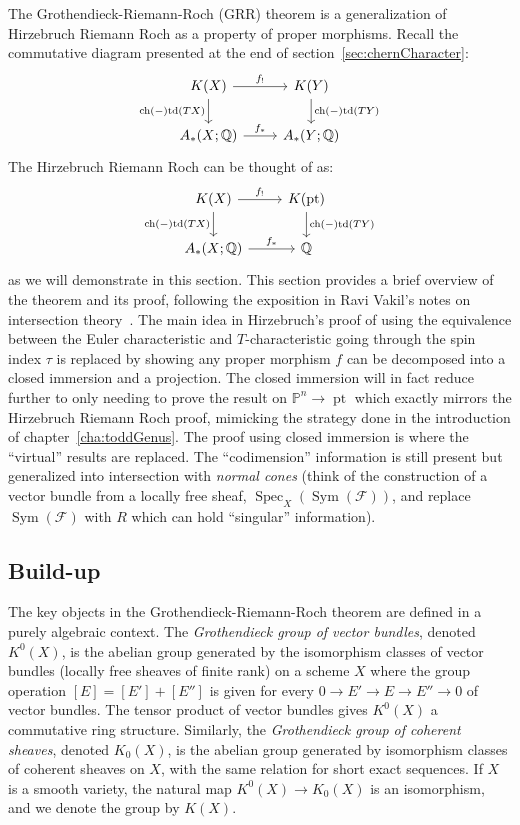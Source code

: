 \documentclass{book}
\newcommand{\Q}{{\mathbb{Q}}}
\renewcommand{\P}{{\mathbb{P}}}
\newcommand{\CF}{{\mathcal{F}}}
\newcommand{\ch}{{\operatorname{ch}}}
\newcommand{\Sym}{\operatorname{Sym}}
\newcommand{\Spec}{{\operatorname{Spec}}}
\newcommand{\td}{{\operatorname{td}}}
\renewcommand{\ch}{{\operatorname{ch}}}
\begin{document}
The Grothendieck-Riemann-Roch (GRR) theorem is a generalization of Hirzebruch Riemann Roch as a property of
proper morphisms. Recall the commutative diagram presented at the end of section~\ref{sec:chernCharacter}:
\[
\begin{tikzcd}
K(X) \arrow[r, "f_!"] \arrow[d, "\ch(-)\td(TX)"'] & K(Y) \arrow[d, "\ch(-)\td(TY)"] \\
A_*(X; \Q) \arrow[r, "f_*"]             & A_*(Y; \Q)
\end{tikzcd}
\]
The Hirzebruch Riemann Roch can be thought of as:
\[
\begin{tikzcd}
  K(X) \arrow[r, "f_!"] \arrow[d, "\ch(-)\td(TX)"'] & K(\operatorname{pt}) \arrow[d, "\ch(-)\td(TY)"] \\
A_*(X; \Q) \arrow[r, "f_*"]             & \Q
\end{tikzcd}
\]
as we will demonstrate in this section. This section provides a brief overview of the theorem and its proof,
following the exposition in Ravi Vakil's notes on intersection theory~\cite{vakilIntersectionTheory}. The main
idea in Hirzebruch's proof of using the equivalence between the Euler characteristic and $T$-characteristic
going through the spin index $\tau$ is replaced by showing any proper morphism $f$ can be decomposed into a
closed immersion and a projection. The closed immersion will in fact reduce further to only needing to prove
the result on $\P^n \to \operatorname{pt}$ which exactly mirrors the Hirzebruch Riemann Roch proof, mimicking
the strategy done in the introduction of chapter~\cref{cha:toddGenus}. The proof using closed immersion is
where the ``virtual'' results are replaced. The ``codimension'' information is still present but generalized
into intersection with \emph{normal cones} (think of the construction of a vector bundle from a locally free
sheaf, $\Spec_X(\Sym(\CF))$, and replace $\Sym(\CF)$ with $R$ which can hold ``singular'' information).


\subsection*{Build-up}

The key objects in the Grothendieck-Riemann-Roch theorem are defined in a purely algebraic context. The
\emph{Grothendieck group of vector bundles}, denoted $K^0(X)$, is the abelian group generated by the
isomorphism classes of vector bundles (locally free sheaves of finite rank) on a scheme $X$ where the group
operation $[E] = [E'] + [E'']$ is given for every $0 \to E' \to E \to E'' \to 0$ of vector
bundles. The tensor product of vector bundles gives $K^0(X)$ a commutative ring structure. Similarly, the
\emph{Grothendieck group of coherent sheaves}, denoted $K_0(X)$, is the abelian group generated by
isomorphism classes of coherent sheaves on $X$, with the same relation for short exact sequences. If $X$ is a
smooth variety, the natural map $K^0(X) \to K_0(X)$ is an isomorphism, and we denote the group by $K(X)$.
\end{document}
